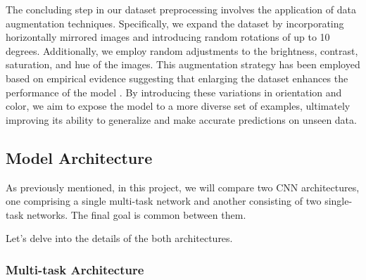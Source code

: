 The concluding step in our dataset preprocessing involves the application
of data augmentation techniques. Specifically, we expand the dataset
by incorporating horizontally mirrored images and introducing random
rotations of up to 10 degrees. Additionally, we employ random adjustments
to the brightness, contrast, saturation, and hue of the images.
This augmentation strategy has been employed based on empirical
evidence suggesting that enlarging the dataset enhances the performance
of the model \cite{app4}. By introducing these variations in orientation and color,
we aim to expose the model to a more diverse set of examples,
ultimately improving its ability to generalize and make accurate
predictions on unseen data.

\subsection{Model Architecture} \label{sec:model}

As previously mentioned, in this project, we will compare two
CNN architectures, one comprising a single multi-task
network and another consisting of two single-task networks.
The final goal is common between them.

Let's delve into the details of the both architectures.

\subsubsection{Multi-task Architecture} \label{sec:multi}


